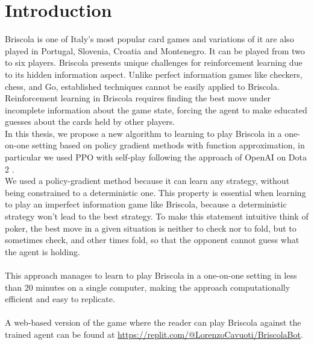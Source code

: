 \chapter{Introduction}
Briscola is one of Italy's most popular card games \cite{briscola-wikipedia} and variations of it are also played in Portugal, Slovenia, Croatia and Montenegro. It can be played from two to six players. Briscola presents unique challenges for reinforcement learning due to its hidden information aspect. Unlike perfect information games like checkers, chess, and Go, established techniques cannot be easily applied to Briscola. Reinforcement learning in Briscola requires finding the best move under incomplete information about the game state, forcing the agent to make educated guesses about the cards held by other players.\\
In this thesis, we propose a new algorithm to learning to play Briscola in a one-on-one setting based on policy gradient methods with function approximation, in particular we used PPO with self-play following the approach of OpenAI on Dota 2 \cite{open-ai-five}.\\
We used a policy-gradient method because it can learn any strategy, without being constrained to a deterministic one. This property is essential when learning to play an imperfect information game like Briscola, because a deterministic strategy won't lead to the best strategy. To make this statement intuitive think of poker, the best move in a given situation is neither to check nor to fold, but to sometimes check, and other times fold, so that the opponent cannot guess what the agent is holding.\\\\
This approach manages to learn to play Briscola in a one-on-one setting in less than 20 minutes on a single computer, making the approach computationally efficient and easy to replicate.\\\\
A web-based version of the game where the reader can play Briscola against the trained agent can be found at \href{https://replit.com/@LorenzoCavuoti/BriscolaBot}{https://replit.com/@LorenzoCavuoti/BriscolaBot}.\\\\

